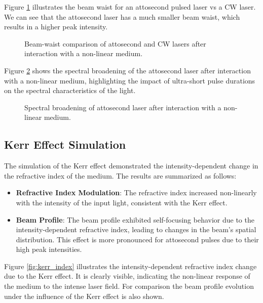 \documentclass[12pt]{article}
\begin{document}
Figure \ref{fig:atto_vs_cw_waist} illustrates the beam waist for an attosecond pulsed laser vs a CW laser. We can see that the attosecond laser has a much smaller beam waist, which results in a higher peak intensity.

\begin{figure}[!ht]
    \centering
    
    \caption{Beam-waist comparison of attosecond and CW lasers after interaction with a non-linear medium.}
    \label{fig:atto_vs_cw_waist}
\end{figure}

Figure \ref{fig:atto_spectrum} shows the spectral broadening of the attosecond laser after interaction with a non-linear medium, highlighting the impact of ultra-short pulse durations on the spectral characteristics of the light.

\begin{figure}[!ht]
    \centering
    
    \caption{Spectral broadening of attosecond laser after interaction with a non-linear medium.}
    \label{fig:atto_spectrum}
\end{figure}

\subsection{Kerr Effect Simulation}

The simulation of the Kerr effect demonstrated the intensity-dependent change in the refractive index of the medium. The results are summarized as follows:

\begin{itemize}
    \item \textbf{Refractive Index Modulation}: The refractive index increased non-linearly with the intensity of the input light, consistent with the Kerr effect.
    \item \textbf{Beam Profile}: The beam profile exhibited self-focusing behavior due to the intensity-dependent refractive index, leading to changes in the beam's spatial distribution. This effect is more pronounced for attosecond pulses due to their high peak intensities. 
\end{itemize}

Figure \ref{fig:kerr_index} illustrates the intensity-dependent refractive index change due to the Kerr effect. It is clearly visible, indicating the non-linear response of the medium to the intense laser field. For comparison the beam profile evolution under the influence of the Kerr effect is also shown.
\end{document}
